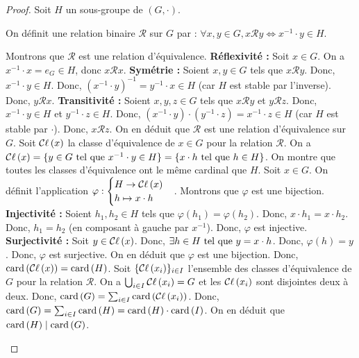 \documentclass[12pt,a4paper]{report}
\begin{document}
\begin{proof}
    Soit $H$ un sous-groupe de $(G,\cdot)$.

    On définit une relation binaire $\mathcal{R}$ sur $G$ par : $\forall x,y \in G, x\mathcal{R}y \iff x^{-1} \cdot y \in H$.

    \begin{outline}
        \1 Montrons que $\mathcal{R}$ est une relation d'équivalence.
            \2 \textbf{Réflexivité :} Soit $x \in G$. On a $x^{-1} \cdot x = e_G \in H$, donc $x \mathcal{R} x$.
            \2 \textbf{Symétrie :} Soient $x,y \in G$ tels que $x \mathcal{R} y$. Donc, $x^{-1} \cdot y \in H$. Donc, $(x^{-1} \cdot y)^{-1} = y^{-1} \cdot x \in H$ (car $H$ est stable par l'inverse). Donc, $y \mathcal{R} x$.
            \2 \textbf{Transitivité :} Soient $x,y,z \in G$ tels que $x \mathcal{R} y$ et $y \mathcal{R} z$. Donc, $x^{-1} \cdot y \in H$ et $y^{-1} \cdot z \in H$. Donc, $(x^{-1} \cdot y) \cdot (y^{-1} \cdot z) = x^{-1} \cdot z \in H$ (car $H$ est stable par $\cdot$). Donc, $x \mathcal{R} z$.
        \1 On en déduit que $\mathcal{R}$ est une relation d'équivalence sur $G$.
        \1 Soit $\mathcal{C}\ell\left(x\right)$ la classe d'équivalence de $x\in G$ pour la relation $\mathcal{R}$.
            \2 On a $\mathcal{C}\ell\left(x\right) = \{y\in G\text{ tel que } x^{-1}\cdot y\in H\} = \{x\cdot h\text{ tel que } h\in H\}$.
        \1 On montre que toutes les classes d'équivalence ont le même cardinal que $H$.
            \2 Soit $x\in G$. On définit l'application $\varphi : \begin{cases}H \to \mathcal{C}\ell\left(x\right)\\ h\mapsto x\cdot h\end{cases}$.
            \2 Montrons que $\varphi$ est une bijection.
                \3 \textbf{Injectivité :} Soient $h_1,h_2 \in H$ tels que $\varphi(h_1) = \varphi(h_2)$. Donc, $x\cdot h_1 = x\cdot h_2$. Donc, $h_1 = h_2$ (en composant à gauche par $x^{-1}$). Donc, $\varphi$ est injective.
                \3 \textbf{Surjectivité :} Soit $y \in \mathcal{C}\ell\left(x\right)$. Donc, $\exists h \in H \text{ tel que } y = x\cdot h$. Donc, $\varphi(h) = y$. Donc, $\varphi$ est surjective.
            \2 On en déduit que $\varphi$ est une bijection.
            \2 Donc, $\mathrm{card}\left(\mathcal{C}\ell\left(x\right)\right) = \mathrm{card}\left(H\right)$.
        \1 Soit $\{\mathcal{C}\ell\left(x_i\right)\}_{i\in I}$ l'ensemble des classes d'équivalence de $G$ pour la relation $\mathcal{R}$.
            \2 On a $\bigcup_{i\in I} \mathcal{C}\ell\left(x_i\right) = G$ et les $\mathcal{C}\ell\left(x_i\right)$ sont disjointes deux à deux.
            \2 Donc, $\mathrm{card}\left(G\right) = \sum_{i\in I} \mathrm{card}\left(\mathcal{C}\ell\left(x_i\right)\right)$.
            \2 Donc, $\mathrm{card}\left(G\right) = \sum_{i\in I} \mathrm{card}\left(H\right) = \mathrm{card}\left(H\right) \cdot \mathrm{card}\left(I\right)$.
        \1 On en déduit que $\mathrm{card}\left(H\right) \mid \mathrm{card}\left(G\right)$.
    \end{outline}
\end{proof}
\end{document}
